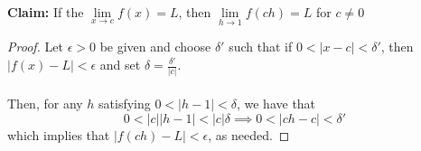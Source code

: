\documentclass{article}
\begin{document}
\section*{}
\textbf{Claim:} If the \(\lim\limits_{x \to c} f(x) = L\), then \(\lim\limits_{h \to 1} f(ch) = L\) for \(c \neq 0\)
\begin{proof}
    Let \(\epsilon > 0\) be given and choose \(\delta'\) such that if \(0 < |x - c| < \delta'\), then \(|f(x) - L| < \epsilon\) and set \(\delta = \frac{\delta'}{|c|}\). \\ \\
    Then, for any \(h\) satisfying \(0 < |h - 1| < \delta\), we have that \[
0 < |c||h - 1| < |c|\delta \implies 0 < |ch - c| < \delta'
    \] which implies that \(|f(ch) - L| < \epsilon\), as needed.
\end{proof}
\end{document}
